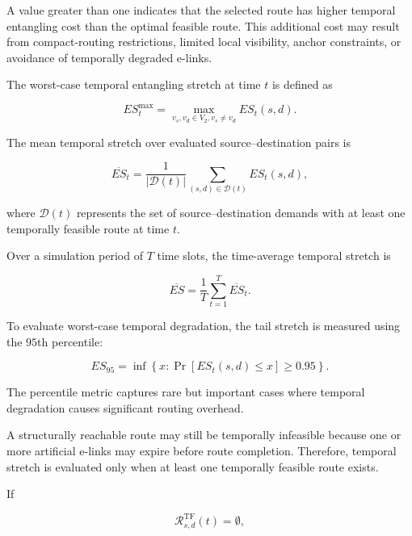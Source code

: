 A value greater than one indicates that the selected route has higher temporal entangling cost than the optimal feasible route. This additional cost may result from compact-routing restrictions, limited local visibility, anchor constraints, or avoidance of temporally degraded e-links.

The worst-case temporal entangling stretch at time $t$ is defined as

\begin{equation}
    ES_t^{\max}
    =
    \max_{
    v_s,v_d\in V_2,
    v_s\neq v_d
    }
    ES_t(s,d).
\end{equation}

The mean temporal stretch over evaluated source--destination pairs is

\begin{equation}
    \overline{ES}_t
    =
    \frac{
    1
    }{
    |\mathcal{D}(t)|
    }
    \sum_{
    (s,d)\in\mathcal{D}(t)
    }
    ES_t(s,d),
\end{equation}

where $\mathcal{D}(t)$ represents the set of source--destination demands with at least one temporally feasible route at time $t$.

Over a simulation period of $T$ time slots, the time-average temporal stretch is

\begin{equation}
    \overline{ES}
    =
    \frac{1}{T}
    \sum_{t=1}^{T}
    \overline{ES}_t .
\end{equation}

To evaluate worst-case temporal degradation, the tail stretch is measured using the $95$th percentile:

\begin{equation}
    ES_{95}
    =
    \inf
    \left\{
    x:
    \Pr
    \left[
    ES_t(s,d)
    \leq x
    \right]
    \geq0.95
    \right\}.
\end{equation}

The percentile metric captures rare but important cases where temporal degradation causes significant routing overhead.

A structurally reachable route may still be temporally infeasible because one or more artificial e-links may expire before route completion. Therefore, temporal stretch is evaluated only when at least one temporally feasible route exists.

If

\begin{equation}
    \mathcal{R}_{s,d}^{\mathrm{TF}}(t)
    =
    \emptyset,
\end{equation}

